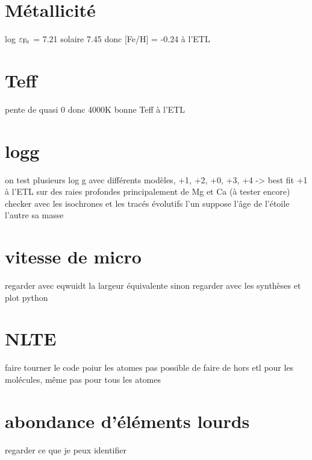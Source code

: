 \documentclass{article}
\begin{document}

  

\section{Métallicité}

log $\varepsilon_{\rm Fe}$ = 7.21
solaire 7.45 
donc [Fe/H] = -0.24 à l'ETL 


\section{Teff}
pente de quasi 0 donc 4000K bonne Teff à l'ETL 

\section{logg}
on test plusieurs log g avec différents modèles, +1, +2, +0, +3, +4 -> best fit +1 à l'ETL 
sur des raies profondes principalement de Mg et Ca (à tester encore)
checker avec les isochrones et les tracés évolutifs 
l'un suppose l'âge de l'étoile l'autre sa masse

\section{vitesse de micro}
regarder avec eqwuidt la largeur équivalente sinon regarder avec les synthèses et plot python

\section{NLTE}
faire tourner le code poiur les atomes
pas possible de faire de hors etl pour les molécules, même pas pour tous les atomes
\section{abondance d'éléments lourds}
regarder ce que je peux identifier
\end{document}
